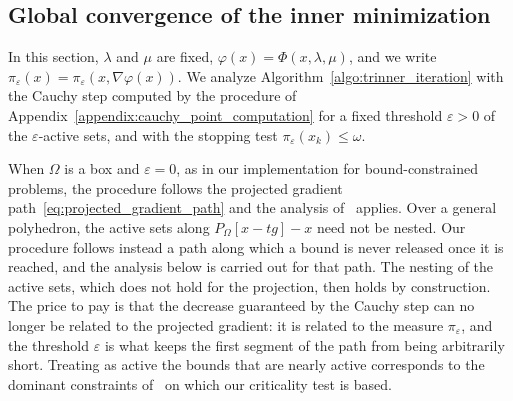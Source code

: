 \documentclass{article}
\numberwithin{equation}{section}
\newcommand{\proj}[2]{P_{#1} \left[ {#2} \right]} %
\theoremstyle{plain}
\begin{document}
\subsection{Global convergence of the inner minimization}\label{subsec:inner_convergence}

In this section, $\lambda$ and $\mu$ are fixed, $\varphi(x) = \Phi(x,\lambda,\mu)$, and we write $\pi_\varepsilon(x) = \pi_\varepsilon(x,\nabla\varphi(x))$. We analyze Algorithm~\ref{algo:trinner_iteration} with the Cauchy step computed by the procedure of Appendix~\ref{appendix:cauchy_point_computation} for a fixed threshold $\varepsilon > 0$ of the $\varepsilon$-active sets, and with the stopping test $\pi_\varepsilon(x_k) \le \omega$.

When $\Omega$ is a box and $\varepsilon = 0$, as in our implementation for bound-constrained problems, the procedure follows the projected gradient path~\eqref{eq:projected_gradient_path} and the analysis of~\cite{conn-etal:1988a} applies. Over a general polyhedron, the active sets along $\proj{\Omega}{x-tg}-x$ need not be nested. Our procedure follows instead a path along which a bound is never released once it is reached, and the analysis below is carried out for that path. The nesting of the active sets, which does not hold for the projection, then holds by construction. The price to pay is that the decrease guaranteed by the Cauchy step can no longer be related to the projected gradient: it is related to the measure $\pi_\varepsilon$, and the threshold $\varepsilon$ is what keeps the first segment of the path from being arbitrarily short. Treating as active the bounds that are nearly active corresponds to the dominant constraints of~\cite{conn-etal:1996b} on which our criticality test is based.
\end{document}

